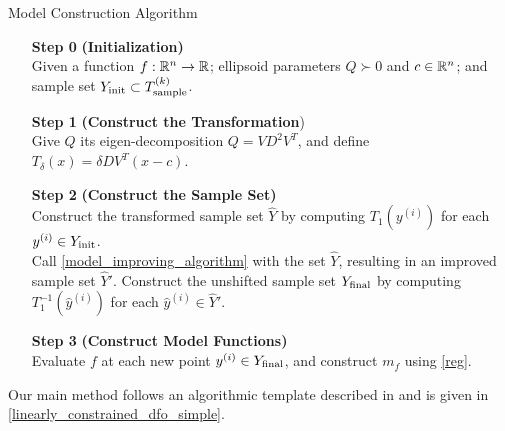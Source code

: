 \documentclass{article}
\begin{document}
{
\begin{fullwidth}[leftmargin=0in, rightmargin=0in, width=\linewidth-0.5in]
\begin{flushleft}

\begin{algorithm}[H]
    \caption{Model Construction Algorithm}
    \label{model_construction_algorithm}
    \begin{itemize}
        \item[\textbf{Step 0}] \textbf{(Initialization)} \\
			Given a function $f : \mathbb R^n \to \mathbb R$;
			ellipsoid parameters $Q \succ 0$ and $c \in \mathbb R^n$;
        	and sample set $Y_{\textrm{init}} \subset {T_{\text{sample}}^{(k)}}$.  
        \item[\textbf{Step 1}] \textbf{(Construct the Transformation}) \\
        	Give $Q$ its eigen-decomposition $Q = VD^2V^T$, and define
			$T_{\delta}(x) =  \delta D V^T\left(x - c\right)$.

        \item[\textbf{Step 2}] \textbf{(Construct the Sample Set)} \\
        Construct the transformed sample set $\hat Y$ by computing $T_1\left(y^{(i)}\right)$ for each $y^{(i)} \in Y_{\textrm{init}}$. \\
        Call \cref{model_improving_algorithm} with the set $\hat{Y}$,  resulting in an improved sample set $\hat{Y}'$.
        Construct the unshifted sample set $Y_{\textrm{final}}$ by computing $T_1^{-1}\left(\hat y^{(i)} \right)$ for each $\hat y^{(i)} \in \hat Y'$.
        \item[\textbf{Step 3}] \textbf{(Construct Model Functions)} \\
        Evaluate $f$ at each new point $y^{(i)} \in Y_{\textrm{final}}$, and construct $m_f$ using \cref{reg}.
    \end{itemize}
\end{algorithm}


\end{flushleft}
\end{fullwidth}
}





Our main method follows
an algorithmic template described in  \cite{Conejo:2013:GCT:2620806.2621814} and is given in \cref{linearly_constrained_dfo_simple}.  
\end{document}
